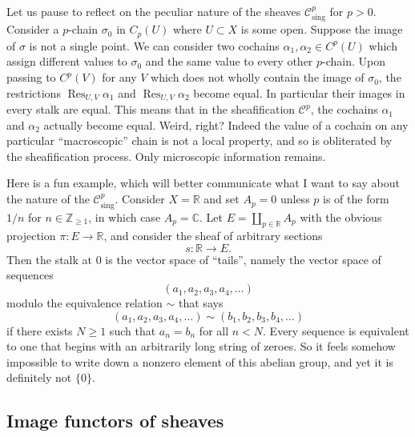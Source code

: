 Let us pause to reflect on the peculiar nature of the sheaves $\mathcal C^p_{\mathrm{sing}}$ for $p>0$. Consider a
$p$-chain $\sigma_0$ in $C_p(U)$ where $U\subset X$ is some open. Suppose the image of $\sigma$ is not a single
point. We can consider two cochains $\alpha_1,\alpha_2\in C^p(U)$ which assign different values to $\sigma_0$ and
the same value to every other $p$-chain. Upon passing to $C^p(V)$ for any $V$ which does not
wholly contain the image of $\sigma_0$, the restrictions
$\operatorname{Res}_{U,V}\alpha_1$ and $\operatorname{Res}_{U,V}\alpha_2$ become equal. In
particular their images in every stalk are equal. This means that in the sheafification $\mathcal C^p$,
the cochains $\alpha_1$ and $\alpha_2$ actually become equal. Weird, right? Indeed the value of a cochain
on any particular “macroscopic” chain is not a local property, and so is obliterated by the
sheafification process. Only microscopic information remains.

Here is a fun example, which will better communicate what I want to say about the nature
of the $\mathcal C^p_{\mathrm{sing}}$. Consider $X=\mathbb R$ and set $A_p=0$ unless $p$ is of the form
$1/n$ for $n\in\mathbb Z_{\geq1}$, in which case $A_p=\mathbb C$. Let
$E=\coprod_{p\in\mathbb R}A_p$ with the obvious projection $\pi:E\to\mathbb R$, and consider
the sheaf of arbitrary sections
\[
s:\mathbb R\to E.
\]
Then the stalk at $0$ is the vector space of “tails”, namely the vector space of sequences
\[
(a_1,a_2,a_3,a_4,\ldots)
\]
modulo the equivalence relation $\sim$ that says
\[
(a_1,a_2,a_3,a_4,\ldots)\sim(b_1,b_2,b_3,b_4,\ldots)
\]
if there exists $N\geq1$ such that $a_n=b_n$ for all $n<N$. Every sequence is equivalent to one
that begins with an arbitrarily long string of zeroes. So it feels somehow impossible to write
down a nonzero element of this abelian group, and yet it is definitely not $\{0\}$.

\subsection{Image functors of sheaves}
\label{ringed-spaces-section-image-functors}
\label{section-pushforward}
\label{section-pullback}

